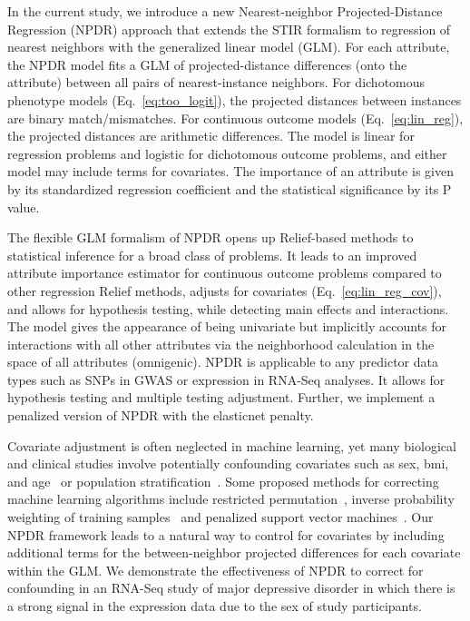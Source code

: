 \documentclass[10pt]{article}
\begin{document}
In the current study, we introduce a new Nearest-neighbor Projected-Distance Regression (NPDR) approach that extends the STIR formalism to regression of nearest neighbors with the generalized linear model (GLM). For each attribute, the NPDR model fits a GLM of projected-distance differences (onto the attribute) between all pairs of nearest-instance neighbors.
For dichotomous phenotype models (Eq.~\ref{eq:too_logit}), the projected distances between instances are binary match/mismatches. For continuous outcome models (Eq.~\ref{eq:lin_reg}), the projected distances are arithmetic differences.
The model is linear for regression problems and logistic for dichotomous outcome problems, and either model may include terms for covariates.
The importance of an attribute is given by its standardized regression coefficient and the statistical significance by its P value.

The flexible GLM formalism of NPDR opens up Relief-based methods to statistical inference for a broad class of problems. It leads to an improved attribute importance estimator for continuous outcome problems compared to other regression Relief methods, adjusts for covariates (Eq.~\ref{eq:lin_reg_cov}), and allows for hypothesis testing, while detecting main effects and interactions. The model gives the appearance of being univariate but implicitly accounts for interactions with all other attributes via the neighborhood calculation in the space of all attributes (omnigenic).
NPDR is applicable to any predictor data types such as SNPs in GWAS or expression in RNA-Seq analyses.
It allows for hypothesis testing and multiple testing adjustment. Further, we implement a penalized version of NPDR with the elasticnet penalty.

Covariate adjustment is often neglected in machine learning, yet many biological and clinical studies involve potentially confounding covariates such as sex, bmi, and age~\cite{le18_brainagesim} or population stratification~\cite{popstrat16}.
Some proposed methods for correcting machine learning algorithms include restricted permutation~\cite{rao2017}, inverse probability weighting of training samples~\cite{linn2016} and penalized support vector machines~\cite{li2011ccsvm}.
Our NPDR framework leads to a natural way to control for covariates by including additional terms for the between-neighbor projected differences for each covariate within the GLM.
We demonstrate the effectiveness of NPDR to correct for confounding in an RNA-Seq study of major depressive disorder in which there is a strong signal in the expression data due to the sex of study participants. 
\end{document}
